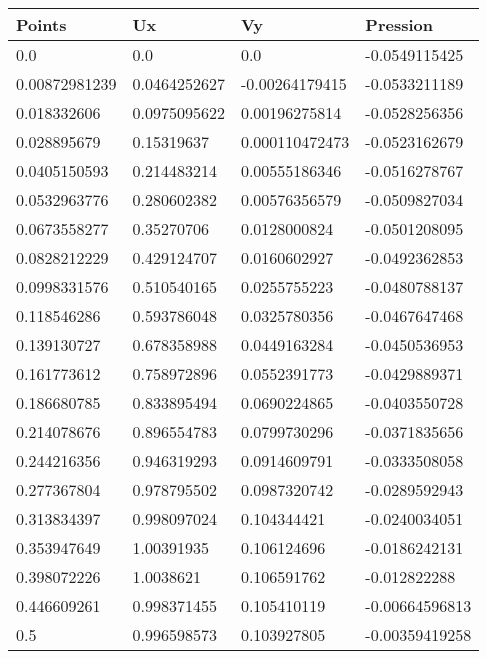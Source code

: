 \begin{tabular}{llll}
	Points & Ux & Vy & Pression \\ 
\midrule 
	0.0 & 0.0 & 0.0 & -0.0549115425 \\ 
	0.00872981239 & 0.0464252627 & -0.00264179415 & -0.0533211189 \\ 
	0.018332606 & 0.0975095622 & 0.00196275814 & -0.0528256356 \\ 
	0.028895679 & 0.15319637 & 0.000110472473 & -0.0523162679 \\ 
	0.0405150593 & 0.214483214 & 0.00555186346 & -0.0516278767 \\ 
	0.0532963776 & 0.280602382 & 0.00576356579 & -0.0509827034 \\ 
	0.0673558277 & 0.35270706 & 0.0128000824 & -0.0501208095 \\ 
	0.0828212229 & 0.429124707 & 0.0160602927 & -0.0492362853 \\ 
	0.0998331576 & 0.510540165 & 0.0255755223 & -0.0480788137 \\ 
	0.118546286 & 0.593786048 & 0.0325780356 & -0.0467647468 \\ 
	0.139130727 & 0.678358988 & 0.0449163284 & -0.0450536953 \\ 
	0.161773612 & 0.758972896 & 0.0552391773 & -0.0429889371 \\ 
	0.186680785 & 0.833895494 & 0.0690224865 & -0.0403550728 \\ 
	0.214078676 & 0.896554783 & 0.0799730296 & -0.0371835656 \\ 
	0.244216356 & 0.946319293 & 0.0914609791 & -0.0333508058 \\ 
	0.277367804 & 0.978795502 & 0.0987320742 & -0.0289592943 \\ 
	0.313834397 & 0.998097024 & 0.104344421 & -0.0240034051 \\ 
	0.353947649 & 1.00391935 & 0.106124696 & -0.0186242131 \\ 
	0.398072226 & 1.0038621 & 0.106591762 & -0.012822288 \\ 
	0.446609261 & 0.998371455 & 0.105410119 & -0.00664596813 \\ 
	0.5 & 0.996598573 & 0.103927805 & -0.00359419258 \\ 
\end{tabular}